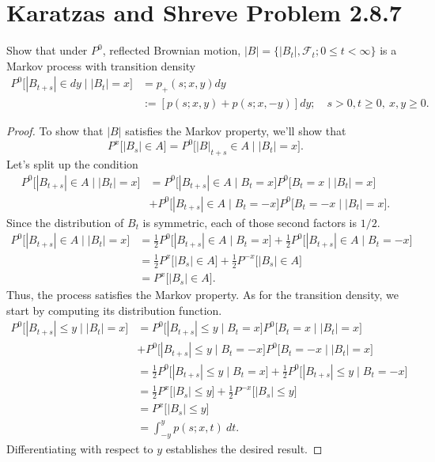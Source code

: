 \documentclass[11pt,letterpaper]{report}
\newcommand{\mcal}[1]{\mathcal{#1}}
\begin{document}
\section*{Karatzas and Shreve Problem 2.8.7}
Show that under $P^0$, reflected Brownian motion, $|B| = \{|B_t|, \mcal{F}_t; 0\leq t<\infty\}$ is a Markov process with transition density
\begin{align*}
	P^0\big[|B_{t+s}|\in dy\mid |B_t| = x\big] &= p_+(s;x,y)dy\\
	&:= [p(s;x,y)+p(s;x,-y)]dy;\quad s>0,t\geq 0,\ x,y\geq 0.
\end{align*}
\begin{proof}
	To show that $|B|$ satisfies the Markov property, we'll show that
	\begin{equation}\label{markov_prop}
		P^x\big[|B_s|\in A\big] = P^0\big[|B|_{t+s}\in A\mid |B_t| = x\big].
	\end{equation}
	Let's split up the condition
	\begin{align*}
		P^0\big[|B_{t+s}|\in A\mid |B_t|=x\big] &= P^0\big[|B_{t+s}|\in A\mid B_t = x\big]P^0\big[B_t=x\mid |B_t|=x\big]\\
		&+ P^0\big[|B_{t+s}|\in A\mid B_t = -x\big]P^0\big[B_t=-x\mid |B_t|=x\big].
	\end{align*}
	Since the distribution of $B_t$ is symmetric, each of those second factors is $1/2$.
	\begin{align*}
		P^0\big[|B_{t+s}|\in A\mid |B_t|=x\big] &= \frac{1}{2}P^0\big[|B_{t+s}|\in A\mid B_t = x\big] + \frac{1}{2}P^0\big[|B_{t+s}|\in A\mid B_t = -x\big]\\
		&= \frac{1}{2}P^x\big[|B_s|\in A\big] + \frac{1}{2}P^{-x}\big[|B_s|\in A\big]\\
		&= P^x\big[|B_s|\in A\big].
	\end{align*}
	Thus, the process satisfies the Markov property. As for the transition density, we start by computing its distribution function.
	\begin{align*}
		P^0\big[|B_{t+s}|\leq y\mid |B_t| = x\big] &= P^0\big[|B_{t+s}|\leq y\mid B_t = x\big]P^0\big[B_t = x\mid |B_t| = x\big]\\
		&+P^0\big[|B_{t+s}|\leq y\mid B_t = -x\big]P^0\big[B_t = -x\mid |B_t| = x\big]\\
		&= \frac{1}{2}P^0\big[|B_{t+s}|\leq y\mid B_t = x\big] + \frac{1}{2}P^0\big[|B_{t+s}|\leq y \mid B_t = -x\big]\\
		&= \frac{1}{2}P^x\big[|B_s|\leq y\big] + \frac{1}{2}P^{-x}\big[|B_s|\leq y\big]\\
		&= P^x\big[|B_s|\leq y\big]\\
		&= \int_{-y}^yp(s;x,t)\ dt.
	\end{align*}
	Differentiating with respect to $y$ establishes the desired result.
\end{proof}
\end{document}
